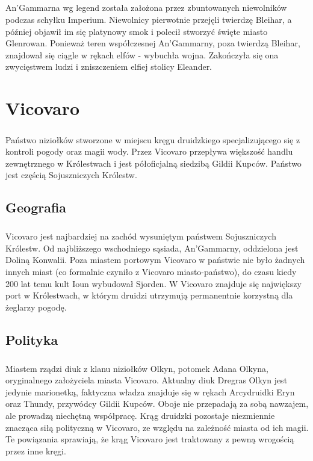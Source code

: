 \documentclass[10pt,twoside,twocolumn]{book}
\begin{document}
\paragraph{}
An'Gammarna wg legend została założona przez zbuntowanych niewolników podczas schyłku Imperium.
Niewolnicy pierwotnie przejęli twierdzę Bleihar, a później objawił im się platynowy smok i polecił stworzyć święte miasto Glenrowan.
Ponieważ teren współczesnej An'Gammarny, poza twierdzą Bleihar, znajdował się ciągle w rękach elfów - wybuchła wojna.
Zakończyła się ona zwycięstwem ludzi i zniszczeniem elfiej stolicy Eleander.

\label{Vicovaro}
\chapter{Vicovaro}

\paragraph{}
Państwo niziołków stworzone w miejscu kręgu druidzkiego specjalizującego się z kontroli pogody oraz magii wody. 
Przez Vicovaro przepływa większość handlu zewnętrznego w Królestwach i jest półoficjalną siedzibą Gildii Kupców.
Państwo jest częścią Sojuszniczych Królestw.

\section{Geografia}
\paragraph{}
Vicovaro jest najbardziej na zachód wysuniętym państwem Sojuszniczych Królestw. 
Od najbliższego wschodniego sąsiada, An'Gammarny, oddzielona jest Doliną Konwalii. 
Poza miastem portowym Vicovaro w państwie nie było żadnych innych miast (co formalnie czyniło z Vicovaro miasto-państwo), do czasu kiedy 200 lat temu kult Ioun wybudował Sjorden. 
W Vicovaro znajduje się największy port w Królestwach, w którym druidzi utrzymują permanentnie korzystną dla żeglarzy pogodę.

\section{Polityka}
\paragraph{}
Miastem rządzi diuk z klanu niziołków Olkyn, potomek Adana Olkyna, oryginalnego założyciela miasta Vicovaro. 
Aktualny diuk Dregras Olkyn jest jedynie marionetką, faktyczna władza znajduje się w rękach Arcydruidki Eryn oraz Thundy, przywódcy Gildii Kupców. 
Oboje nie przepadają za sobą nawzajem, ale prowadzą niechętną współpracę. 
Krąg druidzki pozostaje niezmiennie znacząca siłą polityczną w Vicovaro, ze względu na zależność miasta od ich magii. 
Te powiązania sprawiają, że krąg Vicovaro jest traktowany z pewną wrogością przez inne kręgi.
\end{document}
